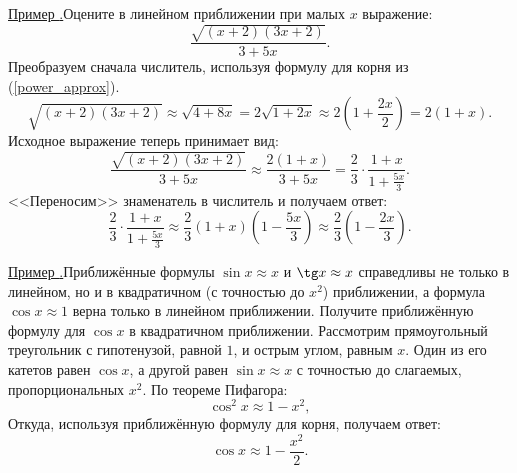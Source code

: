 \documentclass[10pt, xetex]{article}
\newcounter{zadacha}
\newcommand{\z}{\par\vspace{0.6\baselineskip plus 1pt minus 1pt}\noindent\addtocounter{zadacha}{1}\hypertarget{z\thezadacha}{}\hyperlink{an\thezadacha}{{Пример {\arabic{zadacha}.}\:\hskip0.15mm}}}
\begin{document}
\z Оцените в линейном приближении при малых $x$ выражение:
\[
\frac{\sqrt{(x+2)(3x+2)}}{3+5x}.
\]
\baselineskip
Преобразуем сначала числитель, используя формулу для корня из (\ref{power_approx}). 
\[
\sqrt{(x+2)(3x+2)} \approx \sqrt{4+8x} = 2\sqrt{1+2x}\approx 2\left(1+\frac{2x}{2}\right) = 2(1+x).
\]
Исходное выражение теперь принимает вид:
\[
\frac{\sqrt{(x+2)(3x+2)}}{3+5x}\approx \frac{2(1+x)}{3+5x} = \frac{2}{3}\cdot \frac{1+x}{1+\frac{5x}{3}}.
\]
<<Переносим>> знаменатель в числитель и получаем ответ:
\[
\frac{2}{3}\cdot \frac{1+x}{1+\frac{5x}{3}} \approx \frac{2}{3}(1+x)\left(1-\frac{5x}{3}\right) \approx \frac{2}{3}\left(1-\frac{2x}{3}\right).
\]

\z Приближённые формулы $\sin x \approx x$ и $\tg x \approx x$ справедливы не только в линейном, но и в квадратичном (с точностью до $x^{2}$) приближении, а формула $\cos x \approx 1$ верна только в линейном приближении. Получите приближённую формулу для $\cos x$ в квадратичном приближении. 
\baselineskip
Рассмотрим прямоугольный треугольник с гипотенузой, равной $1$, и острым углом, равным $x$. Один из его катетов равен $\cos x$, а другой равен $\sin x \approx x$ с точностью до слагаемых, пропорциональных $x^{2}$. По теореме Пифагора:
\[
\cos^{2}x \approx 1-x^{2},
\]
Откуда, используя приближённую формулу для корня, получаем ответ:
\[
\cos x \approx 1-\frac{x^{2}}{2}.
\]
\end{document}
